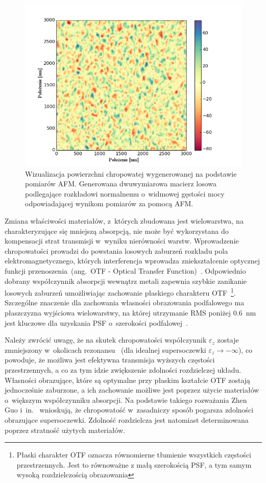 \begin{figure}[htb]
		\includegraphics[width=\textwidth]{images/multilayer/ag30nm-afm-generated.png}
		\caption{Wizualizacja powierzchni chropowatej wygenerowanej na podstawie pomiarów AFM. Generowana dwuwymiarowa macierz losowa podlegające rozkładowi normalnemu o~widmowej gęstości mocy odpowiadającej wynikom pomiarów za pomocą AFM.} 
		\label{fig:ag30nm-afmgene}
\end{figure}


Zmiana właściwości materiałów, z~których zbudowana jest wielowarstwa, na charakteryzujące się mniejszą absorpcją, nie może być wykorzystana do kompensacji strat transmisji w~wyniku nierówności warstw. Wprowadzenie chropowatości prowadzi do powstania losowych zaburzeń rozkładu pola elektromagnetycznego, których interferencja wprowadza zniekształcenie optycznej funkcji przenoszenia~(ang.~OTF - Optical Transfer Function)~\cite{citeulike:2926459}. Odpowiednio dobrany współczynnik absorpcji wewnątrz metali zapewnia szybkie zanikanie losowych zaburzeń umożliwiając zachowanie płaskiego charakteru OTF~\footnote{Płaski charakter OTF oznacza równomierne tłumienie wszystkich częstości przestrzennych. Jest to równoważne z małą szerokością PSF, a tym samym wysoką rozdzielczością obrazowania}. Szczególne znaczenie dla zachowania własności obrazowania podfalowego ma płaszczyzna wyjściowa wielowarstwy, na której utrzymanie RMS poniżej $0.6$~nm jest kluczowe dla uzyskania PSF o~szerokości podfalowej~\cite{guo2014negative}.

Należy zwrócić uwagę, że na skutek chropowatości współczynnik $\varepsilon_z$ zostaje zmniejszony w~okolicach rezonansu~\cite{guo2014negative} (dla idealnej supersoczewki $\varepsilon_{z} \to - \infty$), co powoduje, że możliwa jest efektywna transmisja wyższych częstości przestrzennych, a co za tym idzie zwiększenie zdolności rozdzielczej układu. Własności obrazujące, które są optymalne przy płaskim kształcie OTF zostają jednocześnie zaburzone, a ich zachowanie możliwe jest poprzez użycie materiałów o~większym współczynniku absorpcji. Na podstawie takiego rozważania Zhen Guo i~in.~\cite{guo2014negative} wnioskują, że chropowatość w~zasadniczy sposób pogarsza zdolności obrazujące supersoczewki. Zdolność rozdzielcza jest natomiast determinowana poprzez stratność użytych materiałów.

